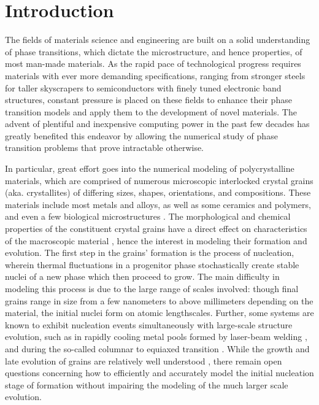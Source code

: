 \chapter{\sf Introduction}\label{ch:intro}

The fields of materials science and engineering are built on a solid understanding of phase transitions, which dictate the microstructure, and hence properties, of most man-made materials.
As the rapid pace of technological progress requires materials with ever more demanding specifications, ranging from stronger steels for taller skyscrapers to semiconductors with finely tuned electronic band structures, constant pressure is placed on these fields to enhance their phase transition models and apply them to the development of novel materials.
The advent of plentiful and inexpensive computing power in the past few decades has greatly benefited this endeavor by allowing the numerical study of phase transition problems that prove intractable otherwise.



In particular, great effort goes into the numerical modeling of polycrystalline materials, which are comprised of numerous microscopic interlocked crystal grains (aka. crystallites) of differing sizes, shapes, orientations, and compositions. These materials include most metals and alloys, as well as some ceramics and polymers, and even a few biological microstructures \cite{jin03}. The morphological and chemical properties of the constituent crystal grains have a direct effect on characteristics of the macroscopic material \cite{granasy_phasefieldnuc,boettinger00}, hence the interest in modeling their formation and evolution. The first step in the grains' formation is the process of nucleation, wherein thermal fluctuations in a progenitor phase stochastically create stable nuclei of a new phase which then proceed to grow. The main difficulty in modeling this process is due to the large range of scales involved: though final grains range in size from a few nanometers to above millimeters depending on the material, the initial nuclei form on atomic lengthscales. Further, some systems are known to exhibit nucleation events simultaneously with large-scale structure evolution, such as in rapidly cooling metal pools formed by laser-beam welding \cite{david03,boettinger00}, and during the so-called columnar to equiaxed transition \cite{kurz01}. While the growth and late evolution of grains are relatively well understood \cite{granasy_02}, there remain open questions concerning how to efficiently and accurately model the initial nucleation stage of formation without impairing the modeling of the much larger scale evolution. 

